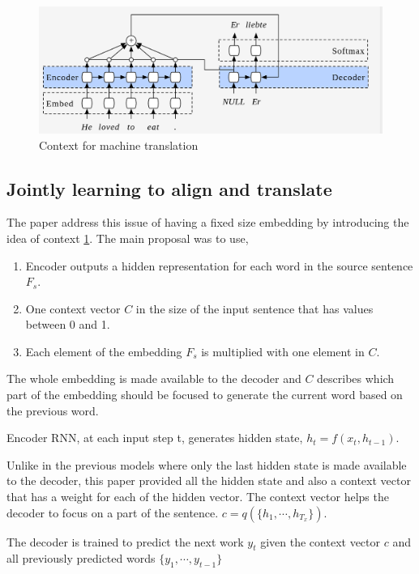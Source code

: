 \documentclass[a4paper]{article}
\begin{document}
\begin{figure}
  \includegraphics[width=.99\linewidth]{img/context.png}
  \caption{Context for machine translation}
  \label{fig:context}
\end{figure}


\subsection{Jointly learning to align and translate} \label{sec:JT}
The paper  \cite{bahdanau2014neural}  address this  issue of having a fixed size
embedding  by  introducing  the  idea of  context  \ref{fig:context}.  The  main
proposal was to use,


\begin{enumerate}
  \item Encoder  outputs a  hidden  representation  for  each word in the source
        sentence $F_s$.
  \item One context vector $C$ in the size of the input sentence that has values
        between 0 and 1.
  \item Each element of the embedding  $F_s$  is multiplied with one  element in
        $C$.
\end{enumerate}


The whole embedding  is made available  to  the decoder and $C$ describes  which
part of the embedding should be focused to generate  the current  word based  on
the previous word.

Encoder  RNN,  at each  input step t,  generates  hidden state,  $h_t  =  f(x_t,
h_{t-1})$.

Unlike in the previous models where only the last hidden state is made available
to the decoder, this paper  provided  all  the hidden state  and also a  context
vector that has a weight for each of the hidden vector. The context vector helps
the decoder to focus on a part of the sentence. $c = q(\{h_1,\cdots,h_{T_x}\})$.


The decoder is  trained to predict the next work $y_t$ given  the context vector
$c$ and all previously predicted words $\{ y_1, \cdots, y_{t-1}\}$
\end{document}
